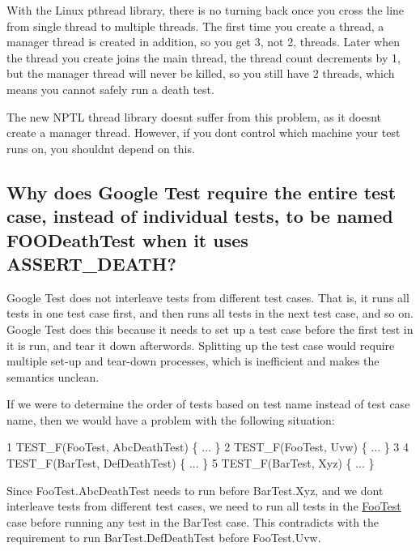 With the Linux pthread library, there is no turning back once you cross the line from single thread to multiple threads. The first time you create a thread, a manager thread is created in addition, so you get 3, not 2, threads. Later when the thread you create joins the main thread, the thread count decrements by 1, but the manager thread will never be killed, so you still have 2 threads, which means you cannot safely run a death test.

The new N\+P\+TL thread library doesn\textquotesingle{}t suffer from this problem, as it doesn\textquotesingle{}t create a manager thread. However, if you don\textquotesingle{}t control which machine your test runs on, you shouldn\textquotesingle{}t depend on this.

\subsection*{Why does Google Test require the entire test case, instead of individual tests, to be named F\+O\+O\+Death\+Test when it uses A\+S\+S\+E\+R\+T\+\_\+\+D\+E\+A\+TH?}

Google Test does not interleave tests from different test cases. That is, it runs all tests in one test case first, and then runs all tests in the next test case, and so on. Google Test does this because it needs to set up a test case before the first test in it is run, and tear it down afterwords. Splitting up the test case would require multiple set-\/up and tear-\/down processes, which is inefficient and makes the semantics unclean.

If we were to determine the order of tests based on test name instead of test case name, then we would have a problem with the following situation\+:


\begin{DoxyCode}
1 TEST\_F(FooTest, AbcDeathTest) \{ ... \}
2 TEST\_F(FooTest, Uvw) \{ ... \}
3 
4 TEST\_F(BarTest, DefDeathTest) \{ ... \}
5 TEST\_F(BarTest, Xyz) \{ ... \}
\end{DoxyCode}


Since {\ttfamily Foo\+Test.\+Abc\+Death\+Test} needs to run before {\ttfamily Bar\+Test.\+Xyz}, and we don\textquotesingle{}t interleave tests from different test cases, we need to run all tests in the {\ttfamily \hyperlink{class_foo_test}{Foo\+Test}} case before running any test in the {\ttfamily Bar\+Test} case. This contradicts with the requirement to run {\ttfamily Bar\+Test.\+Def\+Death\+Test} before {\ttfamily Foo\+Test.\+Uvw}.

